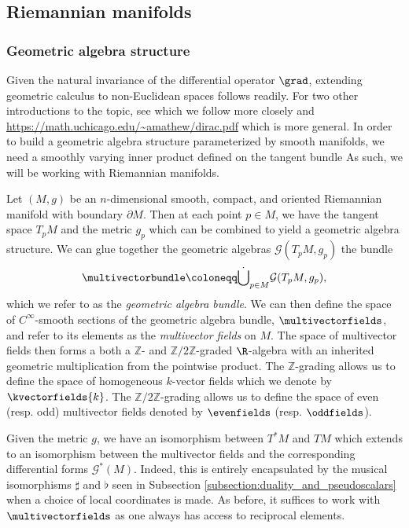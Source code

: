 \subsection{Riemannian manifolds}


\subsubsection{Geometric algebra structure}

Given the natural invariance of the differential operator $\grad$, extending geometric calculus to non-Euclidean spaces follows readily.  For two other introductions to the topic, see \cite{schindler_geometric_2020} which we follow more closely and \url{https://math.uchicago.edu/~amathew/dirac.pdf} which is more general. In order to build a geometric algebra structure parameterized by smooth manifolds, we need a smoothly varying inner product defined on the tangent bundle  As such, we will be working with Riemannian manifolds.

Let $(M,g)$ be an $n$-dimensional smooth, compact, and oriented Riemannian manifold with boundary $\partial M$.  Then at each point  $p\in M$, we have the tangent space $T_pM$ and the metric $g_p$ which can be combined to yield a geometric algebra structure. We can glue together the geometric algebras $\mathcal{G}(T_pM,g_p)$ the bundle
\[
\multivectorbundle \coloneqq \dot{\bigcup}_{p\in M} \mathcal{G} (T_pM,g_p),
\]
which we refer to as the \emph{geometric algebra bundle}.  We can then define the space of $C^\infty$-smooth sections of the geometric algebra bundle, $\multivectorfields$, and refer to its elements as the \emph{multivector fields} on $M$. The space of multivector fields then forms a both a $\mathbb{Z}$- and $\mathbb{Z}/2\mathbb{Z}$-graded $\R$-algebra with an inherited geometric multiplication from the pointwise product. The $\mathbb{Z}$-grading allows us to define the space of homogeneous $k$-vector fields which we denote by $\kvectorfields{k}$.  The $\mathbb{Z}/2\mathbb{Z}$-grading allows us to define the space of even (resp. odd) multivector fields denoted by $\evenfields$ (resp. $\oddfields$).

Given the metric $g$, we have an isomorphism between $T^*M$ and $TM$ which extends to an isomorphism between the multivector fields and the corresponding differential forms $\mathcal{G}^*(M)$.  Indeed, this is entirely encapsulated by the musical isomorphisms $\sharp$ and $\flat$ seen in Subsection \ref{subsection:duality_and_pseudoscalars} when a choice of local coordinates is made. As before, it suffices to work with $\multivectorfields$ as one always has access to reciprocal elements. 

